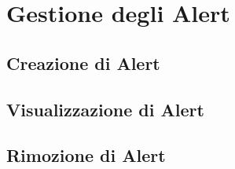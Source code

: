 \section{Gestione degli Alert}\label{Alert}

\subsection{Creazione di Alert}\label{CreaAlert}

\subsection{Visualizzazione di Alert}\label{VisualizzaAlert}

\subsection{Rimozione di Alert}\label{RimuoviAlert}